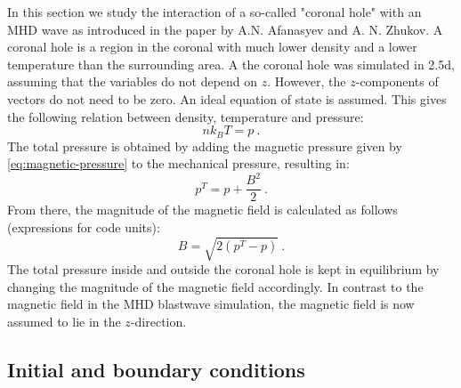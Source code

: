 In this section we study the interaction of a so-called "coronal hole" with an MHD wave as introduced in the paper \cite{coronal-hole} by A.N. Afanasyev and A. N. Zhukov. 
A coronal hole is a region in the coronal with much lower density and a lower temperature than the surrounding area.
A the coronal hole was simulated in 2.5d, assuming that the variables do not depend on $z$. However, the $z$-components of vectors do not need to be zero.
An ideal equation of state is assumed. This gives the following relation between density, temperature and pressure:
\begin{equation}
	nk_BT = p \ .
	\label{eq:ideal-gas}
\end{equation}
The total pressure is obtained by adding the magnetic pressure given by \cref{eq:magnetic-pressure} to the mechanical pressure, resulting in:
\begin{equation*}
	p^T = p + \frac{B^2}{2} \ .
\end{equation*}
From there, the magnitude of the magnetic field is calculated as follows (expressions for code units):
\begin{equation}
	B = \sqrt{2 \left( p^T-p \right) } \ .
	\label{eq:magnetic-magnitude}
\end{equation}
The total pressure inside and outside the coronal hole is kept in equilibrium by changing the magnitude of the magnetic field accordingly.
In contrast to the magnetic field in the MHD blastwave simulation, the magnetic field is now assumed to lie in the $z$-direction.

\subsection{Initial and boundary conditions}

